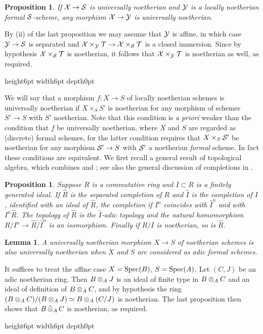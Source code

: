 \documentclass{article}
\theoremstyle{change}
\newtheorem{prop}[subsubsection]{Proposition}
\newtheorem{lemma}[subsubsection]{Lemma}
\numberwithin{equation}{subsubsection}
\newcommand{\demobox}{\vrule height6pt width6pt depth0pt}
\newenvironment{demo}{\noindent{\it Proof.}}
{{\unskip\nobreak\hfil\qquad
\demobox\parfillskip=0pt\par}
\medskip}
\begin{document}
\begin{prop}\label{prop:properties-of-loc-noeth2}
  If ${\cal X}\to{\cal S}$ is universally noetherian and ${\cal Y}$ is a locally
  noetherian formal ${\cal S}$-scheme, any morphism ${\cal X}\to{\cal Y}$ is
  universally noetherian.
\end{prop}
\begin{demo}
  By (ii) of the last proposition we may assume that ${\cal Y}$ is affine,
  in which case ${\cal Y}\to{\cal S}$ is separated and
  ${\cal X}\times_{\cal Y}{\cal T}\to{\cal X}\times_{\cal S}{\cal T}$ is a closed immersion.  Since
  by hypothesis ${\cal X}\times_{\cal S}{\cal T}$ is noetherian, it follows that
  ${\cal X}\times_{\cal Y}{\cal T}$ is noetherian as well, as required.
\end{demo}

We will say that a morphism $f:X\to S$ of locally noetherian schemes
is universally noetherian if $X\times_SS'$ is noetherian for any
morphism of schemes $S'\to S$ with $S'$ noetherian. Note that this
condition is \textit{a priori} weaker than the condition that $f$ be
universally noetherian, where $X$ and $S$ are regarded as (discrete)
formal schemes, for the latter condition requires that $X\times_S{\cal S}'$
be noetherian for any morphism ${\cal S}'\to S$ with ${\cal S}'$ a noetherian
\textit{formal} scheme. In fact these conditions are equivalent. We
first recall a general result of topological algebra, which combines
\cite[Ch. III \S2 no. 12 Cor. 2]{bourbaki-AC} and \cite[Ch. III \S2
no. 10 Cor. 5]{bourbaki-AC}; see also the general discussion of
completions in \cite[III \S2 no.\ 12]{bourbaki-AC}.

\begin{prop}\label{prop:general-noetherian-lemma}
  Suppose $R$ is a commutative ring and $I\subset R$ is a finitely
  generated ideal. If $\hat R$ is the separated completion of $R$ and
  $\hat I$ is the completion of $I$, identified with an ideal of
  $\hat R$, the completion if $I^n$ coincides with $\hat I^n$ and with
  $I^n\hat R$. The topology of $\hat R$ is the $\hat I$-adic topology
  and the natural homomorphism $R/I^n\to\hat R/\hat I^n$ is an
  isomorphism. Finally if $R/I$ is noetherian, so is $\hat R$.
\end{prop}

\begin{lemma}\label{lemma:univ-noeth-ord-schemes}
  A universally noetherian morphism $X\to S$ of noetherian schemes is
  also universally noetherian when $X$ and $S$ are considered as adic
  formal schemes.
\end{lemma}
\begin{demo}
  It suffices to treat the affine case $X={\operatorname{Spec}({B})}$, $S={\operatorname{Spec}({A})}$. Let
  $(C,J)$ be an adic noetherian ring. Then $B\otimes_AJ$ is an ideal of
  finite type in $B\otimes_AC$ and an ideal of definition of
  $B\otimes_AC$, and by hypothesis the ring
  $(B\otimes_AC)/(B\otimes_AJ)\simeq B\otimes_A(C/J)$ is noetherian. The
  last proposition then shows that $B\mathop{\hat\otimes}_AC$ is noetherian, as
  required.
\end{demo}
\end{document}

